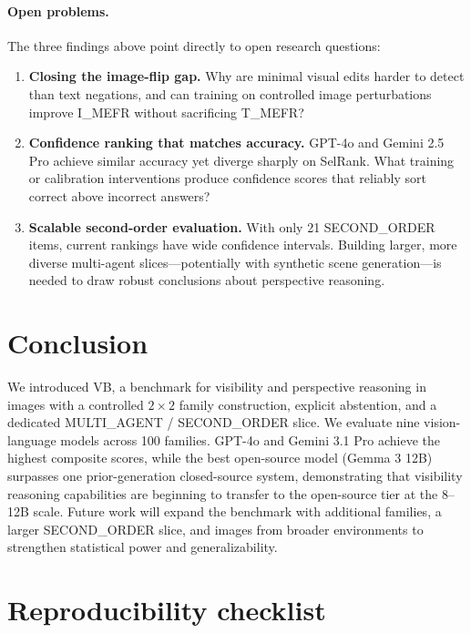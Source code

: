 \documentclass[11pt]{article}
\newcommand{\benchmarkname}{\textsc{VB}}
\begin{document}
\paragraph{Open problems.}
The three findings above point directly to open research questions:
\begin{enumerate}[noitemsep, topsep=3pt]
  \item \textbf{Closing the image-flip gap.} Why are minimal visual edits harder to detect than text negations, and can training on controlled image perturbations improve I\_MEFR without sacrificing T\_MEFR?
  \item \textbf{Confidence ranking that matches accuracy.} GPT-4o and Gemini 2.5 Pro achieve similar accuracy yet diverge sharply on SelRank. What training or calibration interventions produce confidence scores that reliably sort correct above incorrect answers?
  \item \textbf{Scalable second-order evaluation.} With only 21 SECOND\_ORDER items, current rankings have wide confidence intervals. Building larger, more diverse multi-agent slices---potentially with synthetic scene generation---is needed to draw robust conclusions about perspective reasoning.
\end{enumerate}

\section{Conclusion}

We introduced \benchmarkname{}, a benchmark for visibility and perspective reasoning in images with a controlled \(2 \times 2\) family construction, explicit abstention, and a dedicated MULTI\_AGENT / SECOND\_ORDER slice. We evaluate nine vision-language models across 100 families. GPT-4o and Gemini 3.1 Pro achieve the highest composite scores, while the best open-source model (Gemma 3 12B) surpasses one prior-generation closed-source system, demonstrating that visibility reasoning capabilities are beginning to transfer to the open-source tier at the 8--12B scale. Future work will expand the benchmark with additional families, a larger SECOND\_ORDER slice, and images from broader environments to strengthen statistical power and generalizability.

\section*{Reproducibility checklist}
\end{document}
